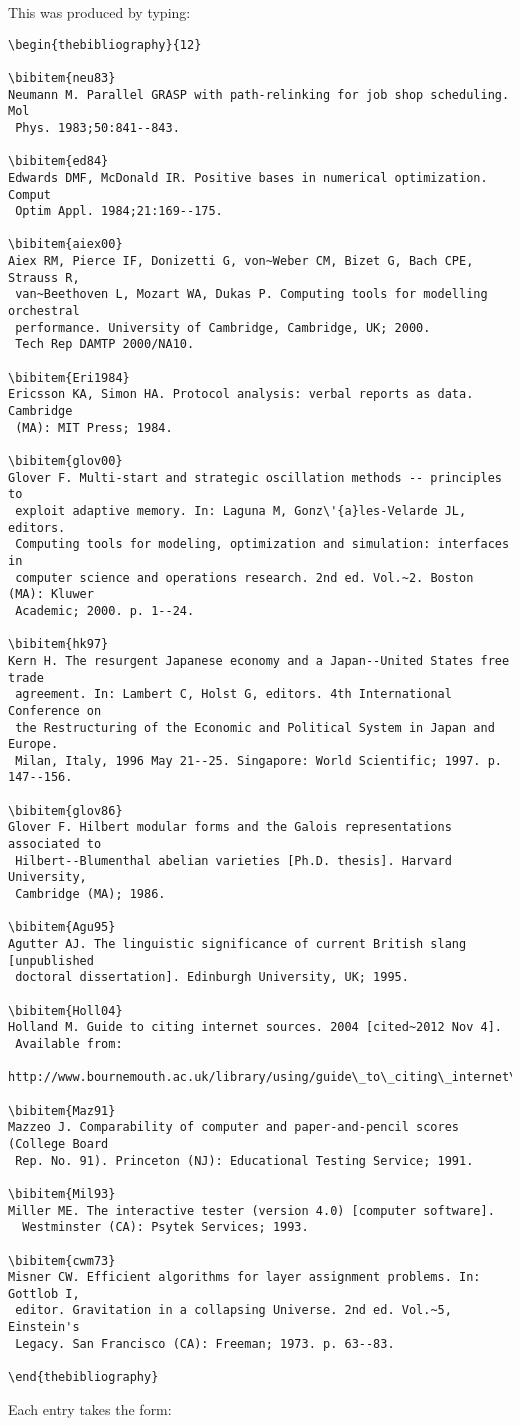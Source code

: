 \documentclass{tADR2e}
\begin{document}
\bigskip
\noindent This was produced by typing:
\medskip

\begin{verbatim}
\begin{thebibliography}{12}

\bibitem{neu83}
Neumann M. Parallel GRASP with path-relinking for job shop scheduling. Mol
 Phys. 1983;50:841--843.

\bibitem{ed84}
Edwards DMF, McDonald IR. Positive bases in numerical optimization. Comput
 Optim Appl. 1984;21:169--175.

\bibitem{aiex00}
Aiex RM, Pierce IF, Donizetti G, von~Weber CM, Bizet G, Bach CPE, Strauss R,
 van~Beethoven L, Mozart WA, Dukas P. Computing tools for modelling orchestral
 performance. University of Cambridge, Cambridge, UK; 2000.
 Tech Rep DAMTP 2000/NA10.

\bibitem{Eri1984}
Ericsson KA, Simon HA. Protocol analysis: verbal reports as data. Cambridge
 (MA): MIT Press; 1984.

\bibitem{glov00}
Glover F. Multi-start and strategic oscillation methods -- principles to
 exploit adaptive memory. In: Laguna M, Gonz\'{a}les-Velarde JL, editors.
 Computing tools for modeling, optimization and simulation: interfaces in
 computer science and operations research. 2nd ed. Vol.~2. Boston (MA): Kluwer
 Academic; 2000. p. 1--24.

\bibitem{hk97}
Kern H. The resurgent Japanese economy and a Japan--United States free trade
 agreement. In: Lambert C, Holst G, editors. 4th International Conference on
 the Restructuring of the Economic and Political System in Japan and Europe.
 Milan, Italy, 1996 May 21--25. Singapore: World Scientific; 1997. p. 147--156.

\bibitem{glov86}
Glover F. Hilbert modular forms and the Galois representations associated to
 Hilbert--Blumenthal abelian varieties [Ph.D. thesis]. Harvard University,
 Cambridge (MA); 1986.

\bibitem{Agu95}
Agutter AJ. The linguistic significance of current British slang [unpublished
 doctoral dissertation]. Edinburgh University, UK; 1995.

\bibitem{Holl04}
Holland M. Guide to citing internet sources. 2004 [cited~2012 Nov 4].
 Available from:
 http://www.bournemouth.ac.uk/library/using/guide\_to\_citing\_internet\_sourc.html.

\bibitem{Maz91}
Mazzeo J. Comparability of computer and paper-and-pencil scores (College Board
 Rep. No. 91). Princeton (NJ): Educational Testing Service; 1991.

\bibitem{Mil93}
Miller ME. The interactive tester (version 4.0) [computer software].
  Westminster (CA): Psytek Services; 1993.

\bibitem{cwm73}
Misner CW. Efficient algorithms for layer assignment problems. In: Gottlob I,
 editor. Gravitation in a collapsing Universe. 2nd ed. Vol.~5, Einstein's
 Legacy. San Francisco (CA): Freeman; 1973. p. 63--83.

\end{thebibliography}
\end{verbatim}
\medskip
\noindent Each entry takes the form:\vspace{12pt}
\end{document}
